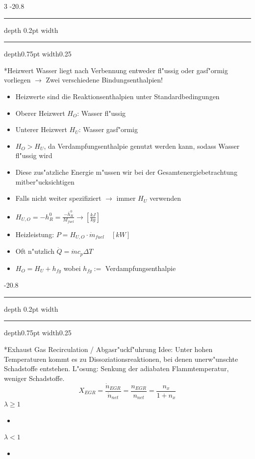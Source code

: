 \documentclass[8pt, landscape, fleqn]{scrartcl}
\makeatletter
\renewcommand{\subsection}{\@startsection{subsection}{1}{0mm}%
{-2\baselineskip}{0.8\baselineskip}%
{\hrule depth 0.2pt width\columnwidth\hrule depth0.75pt
width0.25\columnwidth\vspace*{1.2em}\large\bfseries\rmfamily}}
\makeatother
\begin{document}
\begin{multicols*}{3}
\subsection*{Heizwert}
Wasser liegt nach Verbennung entweder fl"ussig oder gasf"ormig vorliegen $\rightarrow$ Zwei verschiedene Bindungsenthalpien!
\begin{itemize}
\item Heizwerte sind die Reaktionsenthalpien unter Standardbedingungen
\item Oberer Heizwert $H_O$: Wasser fl"ussig
\item Unterer Heizwert $H_U$: Wasser gasf"ormig
\item $H_O > H_U$, da Verdampfungsenthalpie genutzt werden kann, sodass Wasser fl"ussig wird
\item Diese zus"atzliche Energie m"ussen wir bei der Gesamtenergiebetrachtung mitber"ucksichtigen 
\item Falls nicht weiter spezifiziert $\rightarrow$ immer $H_U$ verwenden
\item $H_{U,O} = -h_{R}^0 = \frac{-\bar{h}_{R}^0}{M_{fuel}}  \rightarrow [\frac{kJ}{kg}]$ 
\item Heizleistung: $P=H_{U,O}\cdot \dot{m}_{fuel} \quad [kW]$
\item Oft n"utzlich $\dot{Q} = \dot{m} c_p \Delta T$
\item $H_O = H_U + h_{fg}$ wobei $h_{fg} :=$ Verdampfungsenthalpie
\end{itemize}





\subsection*{Exhaust Gas Recirculation / Abgasr"uckf"uhrung}
Idee: Unter hohen Temperaturen kommt es zu Dissoziationsreaktionen, bei denen unerw"unschte Schadstoffe entstehen. L"osung: Senkung der adiabaten Flammtemperatur, weniger Schadstoffe.
\begin{equation}
X_{EGR}= \frac{\dot{n}_{EGR}}{\dot{n}_{net}} = \frac{{n}_{EGR}}{{n}_{net}} = \frac{n_x}{1+n_x} 
\end{equation}
$\lambda \geq 1$
\begin{itemize}
\item {}
\end{itemize}
$\lambda < 1$
\begin{itemize}
\item {}
\end{itemize}






\end{multicols*}
\end{document}
